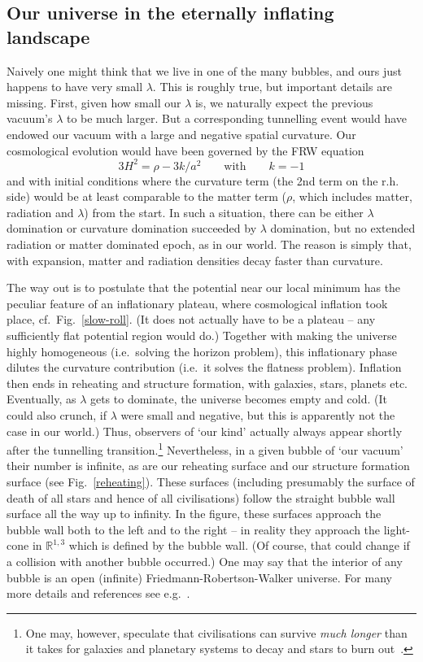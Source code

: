 \documentclass[12pt]{article}
\newcommand{\be}{\begin{equation}}
\newcommand{\ee}{\end{equation}}
\numberwithin{equation}{section}
\begin{document}
\subsection{Our universe in the eternally inflating landscape}\label{sret}

Naively one might think that we live in one of the many bubbles, and ours just happens to have very small $\lambda$. This is roughly true, but important details are missing. First, given how small our $\lambda$ is, we naturally expect the previous vacuum's $\lambda$ to be much larger. But a corresponding tunnelling event would have endowed our vacuum with a large and negative spatial curvature. Our cosmological evolution would have been governed by the FRW equation
\be
3 H^2=\rho - 3k/a^2\qquad \mbox{with} \qquad k=-1
\ee
and with initial conditions where the curvature term (the 2nd term on the r.h. side) would be at least comparable to the matter term ($\rho$, which includes matter, radiation and $\lambda$) from the start. In such a situation, there can be either $\lambda$ domination or curvature domination succeeded by $\lambda$ domination, but no extended radiation or matter dominated epoch, as in our world. The reason is simply that, with expansion, matter and radiation densities decay faster than curvature.

The way out is to postulate that the potential near our local minimum has the peculiar feature of an inflationary plateau, where cosmological inflation took place, cf.~Fig.~\ref{slow-roll}. (It does not actually have to be a plateau -- any sufficiently flat potential region would do.)
Together with making the universe highly homogeneous (i.e.~solving the horizon problem), this inflationary phase dilutes the curvature contribution (i.e.~it solves the flatness problem). Inflation then ends in reheating and structure formation, with galaxies, stars, planets etc. Eventually, as $\lambda$ gets to dominate, the universe becomes empty and cold. (It could also crunch, if $\lambda$ were small and negative, but this is apparently not the case in our world.) Thus, observers of `our kind' actually always appear shortly after the tunnelling transition.\footnote{
One 
may,  however, speculate that civilisations can survive {\it much longer} than it takes for galaxies and planetary systems to decay and stars to burn out~\cite{Dyson:1979zz}.
}
Nevertheless, in a given bubble of `our vacuum' their number is infinite, as are our reheating surface and our structure formation surface (see Fig.~\ref{reheating}). These surfaces (including presumably the surface of death of all stars and hence of all civilisations) follow the straight bubble wall surface all the way up to infinity. In the figure, these surfaces approach the bubble wall both to the left and to the right -- in reality they approach the light-cone in $\mathbb{R}^{1,3}$ which is defined by the bubble wall. (Of course, that could change if a collision with another bubble occurred.) One may say that the interior of any bubble is an open (infinite) Friedmann-Robertson-Walker universe. For many more details and references see e.g.~\cite{Freivogel:2005vv}.
\end{document}
